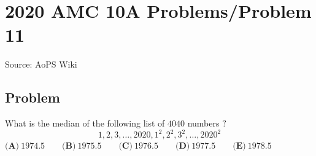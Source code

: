 \documentclass[12pt]{article}
\begin{document}
\section*{{2020 AMC 10A Problems/Problem 11}}
Source: AoPS Wiki

\subsection*{Problem}
What is the median of the following list of $4040$ numbers $?$ \[1, 2, 3, \ldots, 2020, 1^2, 2^2, 3^2, \ldots, 2020^2\] $\textbf{(A)}\ 1974.5\qquad\textbf{(B)}\ 1975.5\qquad\textbf{(C)}\ 1976.5\qquad\textbf{(D)}\ 1977.5\qquad\textbf{(E)}\ 1978.5$
\end{document}
